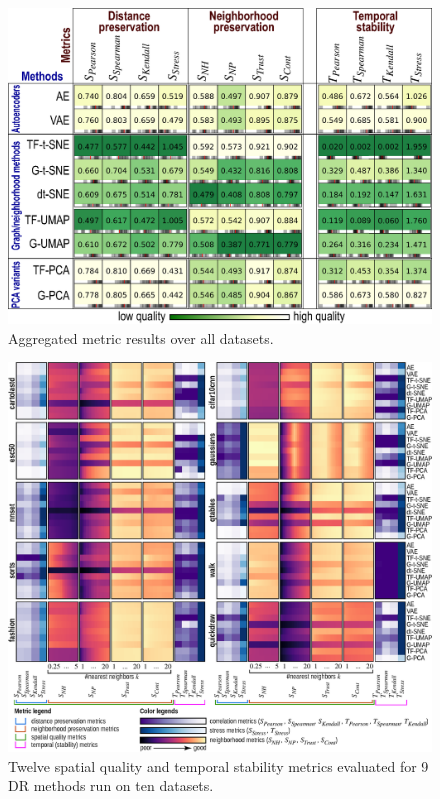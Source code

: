 \begin{figure}[tb]\centering
  \includegraphics[width=.95\linewidth]{figures/projection-evaluation/aggregate_matrix.eps}
  \caption{Aggregated metric results over all datasets.}
  \label{fig:aggregated}
\end{figure}

\begin{figure}[tb]\centering
  \vspace{-0.2cm}
  \includegraphics[width=.84\linewidth]{figures/projection-evaluation/f2.eps}
  \caption{Twelve spatial quality and temporal stability metrics evaluated for 9 DR  methods run on ten datasets.}
  \vspace{-0.2cm}
  \label{fig:all_datasets}
\end{figure}


